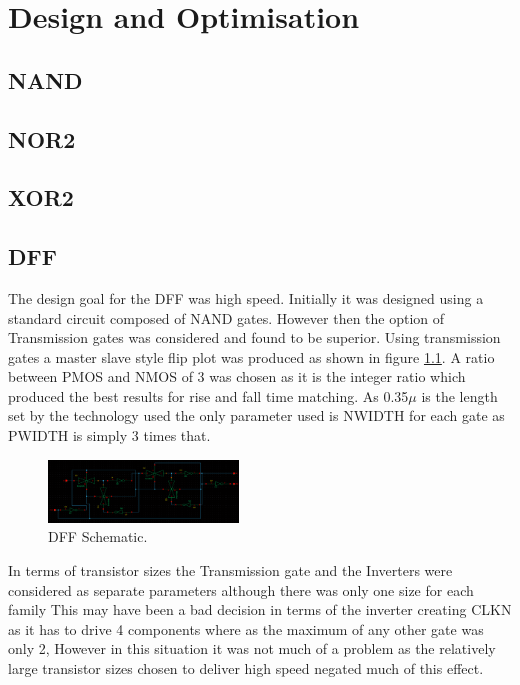 \chapter{Design and Optimisation} 


\section{NAND}

\section{NOR2}

\section{XOR2}

\section{DFF}
The design goal for the DFF was high speed. Initially it was designed using a standard circuit composed of NAND gates. However then the option of Transmission gates was considered and found to be superior. Using transmission gates a master slave style flip plot was produced as shown in figure \ref{fig:DFFSchem}. A ratio between PMOS and NMOS of 3 was chosen as it is the integer ratio which produced the best results for rise and fall time matching. As 0.35$\mu$ is the length set by the technology used the only parameter used is NWIDTH for each gate as PWIDTH is simply 3 times that.

\begin{figure}[h]  
\centering
   \includegraphics[width=0.45\textwidth]{Figures/DFFSchem.png}
\caption{DFF Schematic.}
\label {fig:DFFSchem}
\end{figure}

In terms of transistor sizes the Transmission gate and the Inverters were considered as separate parameters although there was only one size for each family This may have been a bad decision in terms of the inverter creating CLKN as it has to drive 4 components where as the maximum of any other gate was only 2, However in this situation it was not much of a problem as the relatively large transistor sizes chosen to deliver high speed negated much of this effect.

